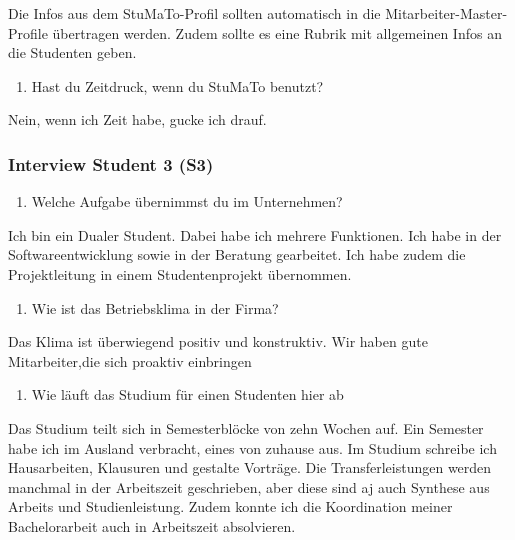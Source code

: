 \documentclass[
  12pt,
  ngerman,
  a4paper,
]{article}
\providecommand{\tightlist}{%
  \setlength{\itemsep}{0pt}\setlength{\parskip}{0pt}}
\begin{document}
Die Infos aus dem StuMaTo-Profil sollten automatisch in die
Mitarbeiter-Master-Profile übertragen werden. Zudem sollte es eine
Rubrik mit allgemeinen Infos an die Studenten geben.

\begin{enumerate}
\def\labelenumi{\arabic{enumi}.}
\setcounter{enumi}{15}
\tightlist
\item
  Hast du Zeitdruck, wenn du StuMaTo benutzt?
\end{enumerate}

Nein, wenn ich Zeit habe, gucke ich drauf.

\hypertarget{interview-student-3-s3}{%
\subsubsection{Interview Student 3 (S3)}\label{interview-student-3-s3}}

\begin{enumerate}
\def\labelenumi{\arabic{enumi}.}
\tightlist
\item
  Welche Aufgabe übernimmst du im Unternehmen?
\end{enumerate}

Ich bin ein Dualer Student. Dabei habe ich mehrere Funktionen. Ich habe
in der Softwareentwicklung sowie in der Beratung gearbeitet. Ich habe
zudem die Projektleitung in einem Studentenprojekt übernommen.

\begin{enumerate}
\def\labelenumi{\arabic{enumi}.}
\setcounter{enumi}{1}
\tightlist
\item
  Wie ist das Betriebsklima in der Firma?
\end{enumerate}

Das Klima ist überwiegend positiv und konstruktiv. Wir haben gute
Mitarbeiter,die sich proaktiv einbringen

\begin{enumerate}
\def\labelenumi{\arabic{enumi}.}
\setcounter{enumi}{2}
\tightlist
\item
  Wie läuft das Studium für einen Studenten hier ab
\end{enumerate}

Das Studium teilt sich in Semesterblöcke von zehn Wochen auf. Ein
Semester habe ich im Ausland verbracht, eines von zuhause aus. Im
Studium schreibe ich Hausarbeiten, Klausuren und gestalte Vorträge. Die
Transferleistungen werden manchmal in der Arbeitszeit geschrieben, aber
diese sind aj auch Synthese aus Arbeits und Studienleistung. Zudem
konnte ich die Koordination meiner Bachelorarbeit auch in Arbeitszeit
absolvieren.
\end{document}
